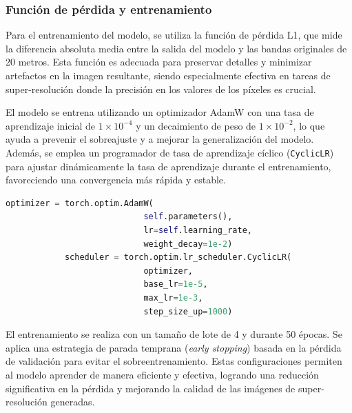         \subsubsection{Función de pérdida y entrenamiento}
            \label{sec:funcion_perdida_fusionx2}

            Para el entrenamiento del modelo, se utiliza la función de pérdida L1, que mide la diferencia absoluta media entre la salida del modelo y las bandas originales de 20 metros. Esta función es adecuada para preservar detalles y minimizar artefactos en la imagen resultante, siendo especialmente efectiva en tareas de super-resolución donde la precisión en los valores de los píxeles es crucial.


            El modelo se entrena utilizando un optimizador AdamW con una tasa de aprendizaje inicial de $1 \times 10^{-4}$ y un decaimiento de peso de $1 \times 10^{-2}$, lo que ayuda a prevenir el sobreajuste y a mejorar la generalización del modelo. Además, se emplea un programador de tasa de aprendizaje cíclico (\texttt{CyclicLR}) para ajustar dinámicamente la tasa de aprendizaje durante el entrenamiento, favoreciendo una convergencia más rápida y estable.

            \begin{lstlisting}[language=Python]
            optimizer = torch.optim.AdamW(
                            self.parameters(), 
                            lr=self.learning_rate, 
                            weight_decay=1e-2)
            scheduler = torch.optim.lr_scheduler.CyclicLR(
                            optimizer, 
                            base_lr=1e-5, 
                            max_lr=1e-3, 
                            step_size_up=1000)
            \end{lstlisting}

            El entrenamiento se realiza con un tamaño de lote de 4 y durante 50 épocas. Se aplica una estrategia de parada temprana (\textit{early stopping}) basada en la pérdida de validación para evitar el sobreentrenamiento. Estas configuraciones permiten al modelo aprender de manera eficiente y efectiva, logrando una reducción significativa en la pérdida y mejorando la calidad de las imágenes de super-resolución generadas.


